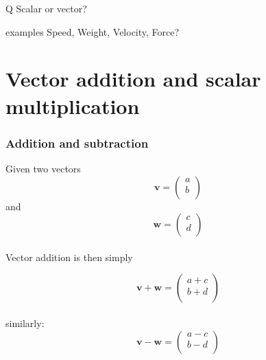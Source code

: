 \documentclass{beamer}
\begin{document}
\begin{frame}
\begin{block}{Q}
Scalar or vector?
\end{block}

\begin{block}{examples}
Speed, Weight, Velocity, Force?
\end{block}
\end{frame}
\section{Vector addition and scalar multiplication}
\frametitle{Addition and subtraction}

\begin{frame}
Given two vectors $$\mathbf{v} = \left(
	\begin{array}{c}
	a\\
	b\\
	\end{array}
	\right)$$
and
	$$\mathbf{w} = \left(
	\begin{array}{c}
	c\\
	d\\
	\end{array}
	\right)$$\\
	Vector addition is then simply
	
	$$\mathbf{v+w} = \left(
	\begin{array}{c}
	a+c\\
	b+d\\
	\end{array}
	\right)$$\\
	
	similarly:
	$$\mathbf{v-w} = \left(
	\begin{array}{c}
	a-c\\
	b-d\\
	\end{array}
	\right)$$
	
	
\end{frame}
\end{document}
